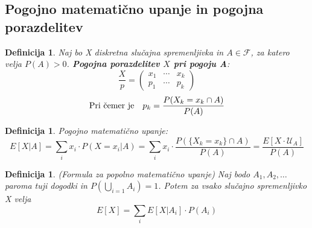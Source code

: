 \documentclass[11pt]{article}
\newtheorem{Definicija}[Izrek]{{\sc Definicija}}
\begin{document}
	\subsection{Pogojno matematično upanje in pogojna porazdelitev}
	\begin{Definicija}
		Naj bo X diskretna slučajna spremenljivka in $A\in \mathcal{F}$, za katero velja $P(A) >0$.\textbf{ Pogojna porazdelitev $X$ pri pogoju A}:
		\[
		\frac{X}{p} = \begin{pmatrix}
		x_1 & \cdots & x_k \\       p_1 & \cdots & p_k
		\end{pmatrix}
		\]
		$$\textnormal{Pri čemer je}\quad p_k= \frac{P(X_k =x_k \cap A)}{P(A)}$$
	\end{Definicija}
	
	\begin{Definicija}
		Pogojno matematično upanje:
		$$E[X|A] = \sum_{i}{x_i \cdot P(X=x_i|A)} = \sum_{i}{x_i \cdot \frac{P(\{X_k =x_k\} \cap A)}{P(A)}} = \frac{E[X\cdot \mathcal{U}_A]}{P(A)}$$
	\end{Definicija}
	\begin{Definicija}
		(Formula za popolno matematično upanje)
		Naj bodo $A_1,A_2, \dotsc$ paroma tuji dogodki in $P(\bigcup_{i=1}A_i) = 1$. Potem za vsako slučajno spremenljivko X velja $$E[X] = \sum_{i}E[X|A_i] \cdot P(A_i)$$ 
	\end{Definicija}
\end{document}

